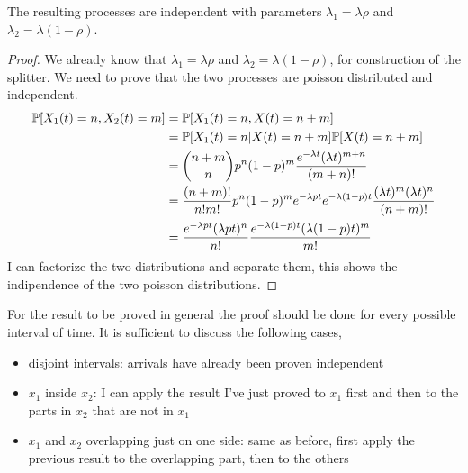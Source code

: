 \begin{itemize}
		\begin{figure}[H]
			\centering
		\end{figure}
		The resulting processes are independent with parameters $\lambda_1=\lambda \rho$ and $\lambda_2 = \lambda (1 - \rho)$.
		\begin{proof}
			We already know that $\lambda_1 = \lambda \rho$ and $\lambda_2 = \lambda (1 - \rho)$, for construction of the splitter.	We need to prove that the two processes are poisson distributed and independent.
			\begin{equation}
				\begin{split}
					\mathbb{P}[X_1(t) = n, X_2(t)=m] &= \mathbb{P}[X_1(t)=n, X(t)= n +m] \\
					&= \mathbb{P}[X_1(t)=n | X(t)=n+m]\mathbb{P}[X(t)=n+m]\\
					&= {{n+m}\choose{n}}p^n(1-p)^m \frac{e^{-\lambda t}(\lambda t)^{m+n}}{(m+n)!}\\
					&= \frac{(n+m)!}{n!m!}p^n(1-p)^m e^{-\lambda p t}e^{-\lambda (1-p)t}\frac{(\lambda t)^m (\lambda t)^n}{(n+m)!}\\
					&= \frac{e^{-\lambda p t}(\lambda p t)^n}{n!}\frac{e^{-\lambda (1-p) t}(\lambda (1-p) t)^m}{m!}
				\end{split}
			\end{equation}
			I can factorize the two distributions and separate them, this shows the indipendence of the two poisson distributions.
		\end{proof}
		For the result to be proved in general the proof should be done for every possible interval of time. It is sufficient to discuss the following cases,
		\begin{itemize}
			\item disjoint intervals: arrivals have already been proven independent
			\item $x_1$ inside $x_2$: I can apply the result I've just proved to $x_1$ first and then to the parts in $x_2$ that are not in $x_1$
			\item $x_1$ and $x_2$ overlapping just on one side: same as before, first apply the previous result to the overlapping part, then to the others
		\end{itemize}
	\end{itemize}
